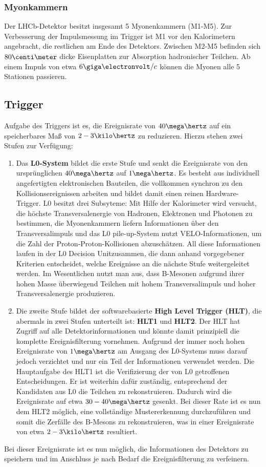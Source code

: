 \subsubsection{Myonkammern}
Der LHCb-Detektor besitzt insgesamt 5 Myonenkammern (M1-M5). Zur Verbesserung der Impulsmessung im Trigger ist M1 vor den Kalorimetern angebracht, die restlichen am Ende des Detektors. Zwischen M2-M5 befinden sich $80\centi\meter$ dicke Eisenplatten zur Absorption hadronischer Teilchen. Ab einem Impuls von etwa $6\giga\electronvolt/c$ können die Myonen alle 5 Stationen passieren. \cite{thesis_linn}

\subsection{Trigger}
Aufgabe des Triggers ist es, die Ereignisrate von $40\mega\hertz$ auf ein speicherbares Maß von $2-3\kilo\hertz$ zu reduzieren. Hierzu stehen zwei Stufen zur Verfügung:
\begin{enumerate}
    \item Das \textbf{L0-System} bildet die erste Stufe und senkt die Ereignisrate von den ursprünglichen $40\mega\hertz$ auf $1\mega\hertz$. Es besteht aus individuell angefertigten elektronischen Bauteilen, die vollkommen synchron zu den Kollisionsereignissen arbeiten und bildet damit einen reinen Hardware-Trigger. L0 besitzt drei Subsyteme: Mit Hilfe der Kalorimeter wird versucht, die höchste Transversalenergie von Hadronen, Elektronen und Photonen zu bestimmen, die Myonenkammern liefern Informationen über den Transversalimpuls und das \glqq L0 pile-up\grqq-System nutzt VELO-Informationen, um die Zahl der Proton-Proton-Kollisionen abzuschätzen. All diese Informationen laufen in der \glqq L0 Decision Unit\grqq zusammen, die dann anhand vorgegebener Kriterien entscheidet, welche Ereignisse an die nächste Stufe weitergeleitet werden. Im Wesentlichen nutzt man aus, dass B-Mesonen aufgrund ihrer hohen Masse überwiegend Teilchen mit hohem Transversalimpuls und hoher Transversalenergie produzieren.
    \item Die zweite Stufe bildet der softwarebasierte \textbf{High Level Trigger (HLT)}, die abermals in zwei Stufen unterteilt ist: \textbf{HLT1} und \textbf{HLT2}. Der HLT hat Zugriff auf alle Detektorinformationen und könnte damit prinzipiell die komplette Ereignisfilterung vornehmen. Aufgrund der immer noch hohen Ereignisrate von $1\mega\hertz$ am Ausgang des L0-Systems muss darauf jedoch verzichtet und nur ein Teil der Informationen verwendet werden. Die Hauptaufgabe des HLT1 ist die Verifizierung der von L0 getroffenen Entscheidungen. Er ist weiterhin dafür zuständig, entsprechend der Kandidaten aus L0 die Teilchen zu rekonstruieren. Dadurch wird die Ereignisrate auf etwa $30-40\mega\hertz$ gesenkt. Bei dieser Rate ist es nun dem HLT2 möglich, eine vollständige Mustererkennung durchzuführen und somit die Zerfälle des B-Mesons zu rekonstruieren, was in einer Ereignisrate von etwa $2-3\kilo\hertz$ resultiert. 
\end{enumerate}
Bei dieser Ereignisrate ist es nun möglich, die Informationen des Detektors zu speichern und im Anschluss je nach Bedarf die Ereignisfilterung zu verfeinern. \cite{detektor}